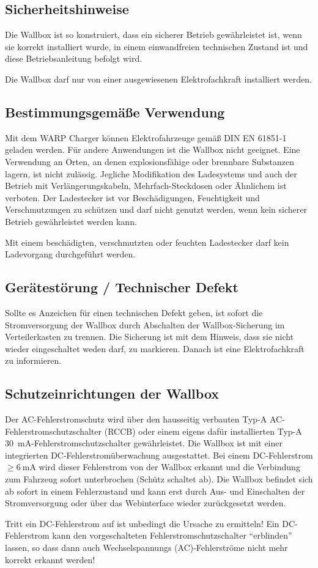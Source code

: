 \documentclass[a4paper,10pt]{article}
\newcommand{\hint}[1]{\begin{tcolorbox}[colback=boxgray,colframe=black,coltext=
white,title=Hinweis,left*=2mm,right*=2mm,boxsep=1mm,bottom=1mm,top=1mm]#1\end{tcolorbox}}
\begin{document}
\begin{multicols*}{2}
	\newpage
	\section{Sicherheitshinweise}
	Die Wallbox ist so konstruiert, dass ein sicherer Betrieb gewährleistet ist,
	wenn sie korrekt installiert wurde, in einem einwandfreien technischen Zustand
	ist und diese Betriebsanleitung befolgt wird. \hint{Die Wallbox darf nur von einer ausgewiesenen Elektrofachkraft installiert
		werden.}

	\subsection{Bestimmungsgemäße Verwendung}
	Mit dem WARP Charger können Elektrofahrzeuge gemäß DIN EN 61851-1 geladen
	werden. Für andere Anwendungen ist die Wallbox nicht geeignet. Eine Verwendung
	an Orten, an denen explosionsfähige oder brennbare Substanzen lagern, ist nicht
	zulässig. Jegliche Modifikation des Ladesystems und auch der Betrieb mit
	Verlängerungskabeln, Mehrfach-Steckdosen oder Ähnlichem ist verboten. Der
	Ladestecker ist vor Beschädigungen, Feuchtigkeit und Verschmutzungen zu
	schützen und darf nicht genutzt werden, wenn kein sicherer Betrieb
	gewährleistet werden kann. \hint{Mit einem beschädigten, verschmutzten oder feuchten Ladestecker darf kein Ladevorgang durchgeführt
		werden.}

	\subsection{Gerätestörung / Technischer Defekt}
	Sollte es Anzeichen für einen technischen Defekt geben, ist sofort die
	Stromversorgung der Wallbox durch Abschalten der Wallbox-Sicherung im Verteilerkasten zu trennen.
	Die Sicherung ist mit dem Hinweis, dass sie nicht wieder eingeschaltet weden darf, zu markieren.
	Danach ist eine Elektrofachkraft zu informieren.

	\subsection{Schutzeinrichtungen der Wallbox}\label{dcerrorhint}
	Der AC-Fehlerstromschutz wird über den hausseitig verbauten
	Typ-A AC-Fehlerstromschutzschalter (RCCB) oder einem eigens dafür installierten
	Typ-A \SI{30}{\milli\ampere}-Fehlerstromschutzschalter gewährleistet. Die Wallbox ist
	mit einer integrierten DC-Fehlerstromüberwachung ausgestattet.
	Bei einem DC-Fehlerstrom $\geq \SI{6}{\milli\ampere}$ wird dieser
	Fehlerstrom von der Wallbox erkannt und die Verbindung zum Fahrzeug sofort
	unterbrochen (Schütz schaltet ab). Die Wallbox befindet sich ab sofort in einem
	Fehlerzustand und kann erst durch Aus- und Einschalten der
	Stromversorgung oder über das Webinterface wieder zurückgesetzt werden.
	\hint{Tritt ein DC-Fehlerstrom auf ist unbedingt die Ursache zu
	ermitteln! Ein DC-Fehlerstrom kann den vorgeschalteten Fehlerstromschutzschalter
	\enquote{erblinden} lassen, so dass dann auch Wechselspannungs
	(AC)-Fehlerströme nicht mehr korrekt erkannt werden!}


\end{multicols*}
\end{document}
